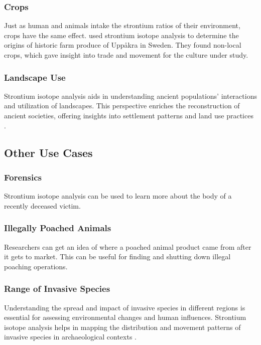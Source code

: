 \documentclass[a4paper, 12pt]{article}
\begin{document}
\subsubsection{Crops}
Just as human and animals intake the strontium ratios of their environment, crops
have the same effect. \cite{larsson2020} used strontium isotope analysis to determine the
origins of historic farm produce of Uppåkra in Sweden. They found non-local crops, which
gave insight into trade and movement for the culture under study.

\subsubsection{Landscape Use}
Strontium isotope analysis aids in understanding ancient populations' interactions
and utilization of landscapes. This perspective enriches the reconstruction of
ancient societies, offering insights into settlement patterns and land use
practices \citep{crowley2017}.


\subsection{Other Use Cases}
\subsubsection{Forensics}
Strontium isotope analysis can be used to learn more about the body of a recently
deceased victim.

\subsubsection{Illegally Poached Animals}
Researchers can get an idea of where a poached animal product came from after it
gets to market. This can be useful for finding and shutting down illegal poaching
operations.

\subsubsection{Range of Invasive Species}
Understanding the spread and impact of invasive species in different regions is
essential for assessing environmental changes and human influences. Strontium
isotope analysis helps in mapping the distribution and movement patterns of
invasive species in archaeological contexts \citep{crowley2017}.
\end{document}

